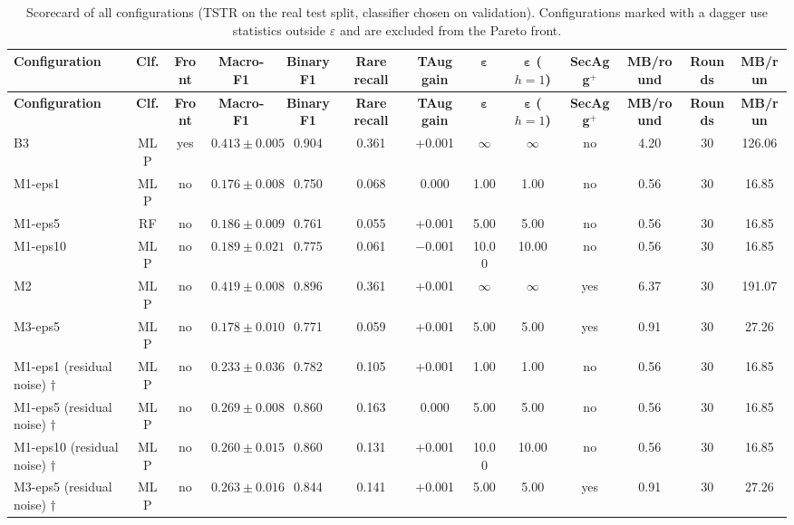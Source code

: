 \begin{landscape}
\scriptsize
\begin{longtable}{lccccccccccc c}
\caption{Scorecard of all configurations (TSTR on the real test split, classifier chosen on validation). Configurations marked with a dagger use statistics outside $\varepsilon$ and are excluded from the Pareto front.}\label{tab:app_scorecard}\\
\toprule
\textbf{Configuration} & \textbf{Clf.} & \textbf{Front} & \textbf{Macro-F1} & \textbf{Binary F1} & \textbf{Rare recall} & \textbf{TAug gain} & $\boldsymbol{\varepsilon}$ & $\boldsymbol{\varepsilon}$ \textbf{($h{=}1$)} & \textbf{SecAgg$^+$} & \textbf{MB/round} & \textbf{Rounds} & \textbf{MB/run} \\
\midrule
\endfirsthead
\toprule
\textbf{Configuration} & \textbf{Clf.} & \textbf{Front} & \textbf{Macro-F1} & \textbf{Binary F1} & \textbf{Rare recall} & \textbf{TAug gain} & $\boldsymbol{\varepsilon}$ & $\boldsymbol{\varepsilon}$ \textbf{($h{=}1$)} & \textbf{SecAgg$^+$} & \textbf{MB/round} & \textbf{Rounds} & \textbf{MB/run} \\
\midrule
\endhead
\bottomrule
\endfoot
B3 & MLP & yes & $0.413 \pm 0.005$ & 0.904 & 0.361 & +0.001 & $\infty$ & $\infty$ & no & 4.20 & 30 & 126.06 \\
M1-eps1 & MLP & no & $0.176 \pm 0.008$ & 0.750 & 0.068 & 0.000 & 1.00 & 1.00 & no & 0.56 & 30 & 16.85 \\
M1-eps5 & RF & no & $0.186 \pm 0.009$ & 0.761 & 0.055 & +0.001 & 5.00 & 5.00 & no & 0.56 & 30 & 16.85 \\
M1-eps10 & MLP & no & $0.189 \pm 0.021$ & 0.775 & 0.061 & $-$0.001 & 10.00 & 10.00 & no & 0.56 & 30 & 16.85 \\
M2 & MLP & no & $0.419 \pm 0.008$ & 0.896 & 0.361 & +0.001 & $\infty$ & $\infty$ & yes & 6.37 & 30 & 191.07 \\
M3-eps5 & MLP & no & $0.178 \pm 0.010$ & 0.771 & 0.059 & +0.001 & 5.00 & 5.00 & yes & 0.91 & 30 & 27.26 \\
M1-eps1 (residual noise) $\dagger$ & MLP & no & $0.233 \pm 0.036$ & 0.782 & 0.105 & +0.001 & 1.00 & 1.00 & no & 0.56 & 30 & 16.85 \\
M1-eps5 (residual noise) $\dagger$ & MLP & no & $0.269 \pm 0.008$ & 0.860 & 0.163 & 0.000 & 5.00 & 5.00 & no & 0.56 & 30 & 16.85 \\
M1-eps10 (residual noise) $\dagger$ & MLP & no & $0.260 \pm 0.015$ & 0.860 & 0.131 & +0.001 & 10.00 & 10.00 & no & 0.56 & 30 & 16.85 \\
M3-eps5 (residual noise) $\dagger$ & MLP & no & $0.263 \pm 0.016$ & 0.844 & 0.141 & +0.001 & 5.00 & 5.00 & yes & 0.91 & 30 & 27.26 \\

\end{longtable}
\end{landscape}
